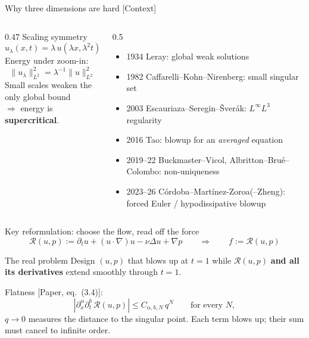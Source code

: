 \documentclass[aspectratio=169,11pt]{beamer}
\newcommand{\Res}{\mathcal{R}}
\newcommand{\src}[1]{{\scriptsize\color{accent}\textsf{[#1]}}}
\begin{document}
\begin{frame}{Why three dimensions are hard \src{Context}}
\begin{columns}[T]
\begin{column}{0.47\textwidth}
Scaling symmetry
\[
u_\lambda(x,t)=\lambda\,u(\lambda x,\lambda^2t)
\]
Energy under zoom-in:
\[
\|u_\lambda\|_{L^2}^2=\lambda^{-1}\|u\|_{L^2}^2
\]
\small Small scales weaken the only global bound\\ $\Rightarrow$ energy is \textbf{supercritical}.
\end{column}
\begin{column}{0.5\textwidth}
\small
\begin{itemize}
\item 1934 Leray: global weak solutions
\item 1982 Caffarelli--Kohn--Nirenberg: small singular set
\item 2003 Escauriaza--Seregin--\v{S}ver\'ak: $L^\infty L^3$ regularity
\item 2016 Tao: blowup for an \emph{averaged} equation
\item 2019--22 Buckmaster--Vicol, Albritton--Bru\'e--Colombo: non-uniqueness
\item 2023--26 C\'ordoba--Mart\'inez-Zoroa(--Zheng): forced Euler / hypodissipative blowup
\end{itemize}
\end{column}
\end{columns}
\end{frame}

\begin{frame}{Key reformulation: choose the flow, read off the force}
\[
\Res(u,p):=\partial_t u+(u\cdot\nabla)u-\nu\Delta u+\nabla p \qquad\Longrightarrow\qquad f:=\Res(u,p)
\]
\begin{block}{The real problem}
Design $(u,p)$ that blows up at $t=1$ while $\Res(u,p)$ \textbf{and all its derivatives} extend smoothly through $t=1$.
\end{block}
\vspace{2mm}
Flatness \src{Paper, eq.~(3.4)}:
\[
|\partial_x^\alpha\partial_t^b\,\Res(u,p)|\le C_{\alpha,b,N}\,q^N\qquad\text{for every }N,
\]
\small $q\to0$ measures the distance to the singular point. Each term blows up; their sum must cancel to infinite order.
\end{frame}
\end{document}
